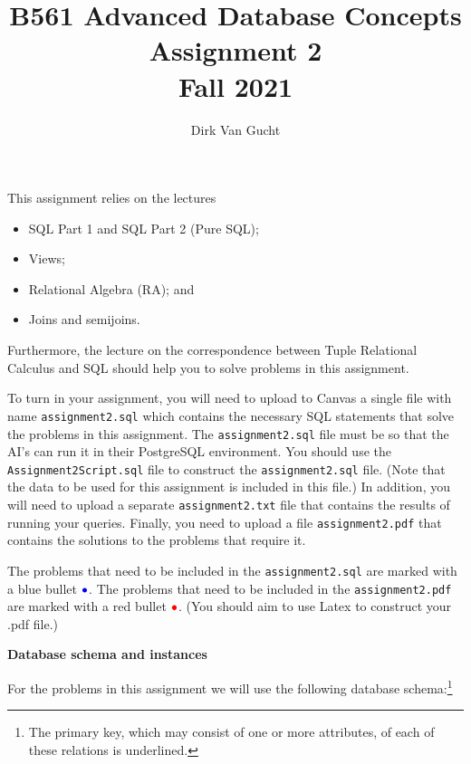 \documentclass[11pt]{article}
\newcommand{\red}[1]{{\color{red}#1}}
\newcommand{\blue}[1]{{\color{blue}#1}}
\newcommand{\redbullet}{$\red{\bullet}$}
\newcommand{\bluebullet}{$\blue{\bullet}$}
\begin{document}
\title{B561 Advanced Database Concepts \\Assignment 2 \\Fall 2021}
\author{Dirk Van Gucht}
\date{}
\maketitle

This {assignment} relies on the lectures
\begin{itemize}
\item SQL Part 1 and SQL Part 2 (Pure SQL);
\item Views;
\item Relational Algebra (RA);  and 
\item Joins and semijoins. 
\end{itemize}

Furthermore, the lecture on the correspondence between Tuple Relational Calculus and SQL should help you to solve problems in this assignment.

To turn in your assignment, you will need to upload to Canvas a single file with name {\tt assignment2.sql} which contains 
the necessary SQL statements that solve the problems in this assignment.   
The {\tt assignment2.sql} file must be so that the AI's can run it in their PostgreSQL environment.  
You should use the {\tt Assignment2Script.sql} file to construct the {\tt assignment2.sql} file. (Note that the data to be used for this assignment is included in this file.)
In addition, you will need to upload a separate {\tt assignment2.txt} file that contains the results of running
your queries.
Finally, you need to upload a file {\tt assignment2.pdf} that contains the solutions to the problems that require it.


The problems that need to be included in the {\tt assignment2.sql} are marked with a blue bullet \bluebullet.
The problems that need to be included in the {\tt assignment2.pdf} are marked with a red bullet \redbullet.
(You should aim to use Latex to construct your .pdf file.)

\newpage
\noindent
\large{\bf Database schema and instances}
\bigskip




For the problems in this assignment we will use the following database schema:\footnote{The primary key, which may consist of one or more attributes, of each of these relations is underlined.}
\end{document}
